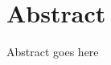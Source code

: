 \documentclass[../main.tex]{subfiles}
\begin{document}
\chapter{Abstract}

Abstract goes here
\end{document}
